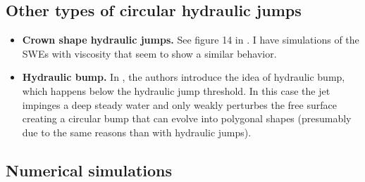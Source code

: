 \documentclass[english,11pt]{article}
\let\cite=\citet
\numberwithin{remark}{subsection}
\begin{document}
\subsection{Other types of circular hydraulic jumps}
\begin{itemize}
\item{\bf Crown shape hydraulic jumps.} See figure 14 in \cite{bush2006experimental}.
  I have simulations of the SWEs with viscosity that seem to show a similar behavior.

\item
  {\bf Hydraulic bump.} In \cite{labousse2013hydraulic}, the authors introduce the idea of hydraulic bump,
  which happens below the hydraulic jump threshold. In this case the jet impinges a deep steady water and only 
  weakly perturbes the free surface creating a circular bump that can evolve into polygonal shapes
  (presumably due to the same reasons than with hydraulic jumps).

\end{itemize}

\subsection{Numerical simulations}
\end{document}
